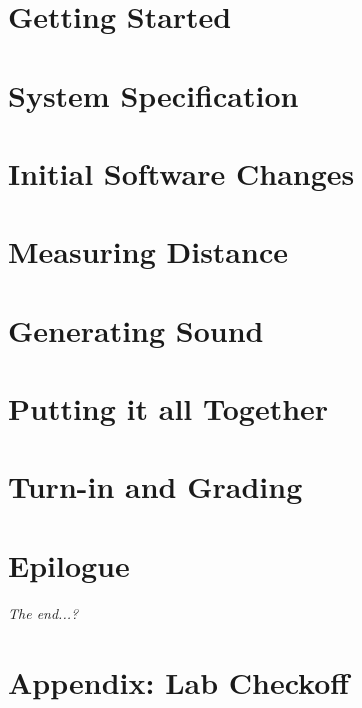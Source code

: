     \section{Getting Started} \label{sec:GettingStarted}                

    \section{System Specification} \label{sec:spec}                     

    \section{Initial Software Changes} \label{sec:initialSoftware}      

    \section{Measuring Distance} \label{sec:distance}                   

    \section{Generating Sound} \label{sec:sound}                        

    \section{Putting it all Together} \label{sec:integration}           

    \section{Turn-in and Grading}                                       

    \section*{Epilogue}                                                 \RangeFinderDetecting

    \textit{The end...?}

    \appendix

    \section{Appendix: Lab Checkoff}                                    


